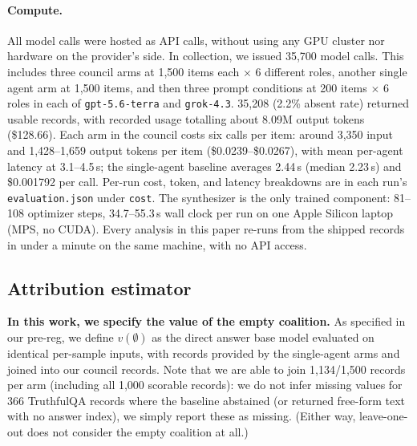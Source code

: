 \paragraph{Compute.}
All model calls were hosted as API calls, without using any GPU cluster nor hardware on the
provider's side. In collection, we issued 35,700 model calls. This includes three council arms at
1,500 items each $\times$ 6 different roles, another single agent arm at 1,500 items, and then three
prompt conditions at 200 items $\times$ 6 roles in each of \texttt{gpt-5.6-terra} and
\texttt{grok-4.3}. 35,208 (2.2\% absent rate) returned usable records, with recorded usage totalling
about 8.09M output tokens (\$128.66). Each arm in the council costs six calls per item: around 3,350
input and 1,428--1,659 output tokens per item (\$0.0239--\$0.0267), with mean per-agent latency at
3.1--4.5\,s; the single-agent baseline averages 2.44\,s (median 2.23\,s) and \$0.001792 per call.
Per-run cost, token, and latency breakdowns are in each run's \texttt{evaluation.json} under
\texttt{cost}. The synthesizer is the only trained component: 81--108 optimizer steps, 34.7--55.3\,s
wall clock per run on one Apple Silicon laptop (MPS, no CUDA). Every analysis in this paper re-runs
from the shipped records in under a minute on the same machine, with no API access.

\subsection{Attribution estimator}
\label{sec:attribution}

\textbf{In this work, we specify the value of the empty coalition.} As specified in our pre-reg, we
define $v(\emptyset)$ as the direct answer base model evaluated on identical per-sample inputs, with
records provided by the single-agent arms and joined into our council records. Note that we are able
to join 1,134/1,500 records per arm (including all 1,000 scorable records): we do not infer missing
values for 366 TruthfulQA records where the baseline abstained (or returned free-form text with no
answer index), we simply report these as missing. (Either way, leave-one-out does not consider the
empty coalition at all.)

